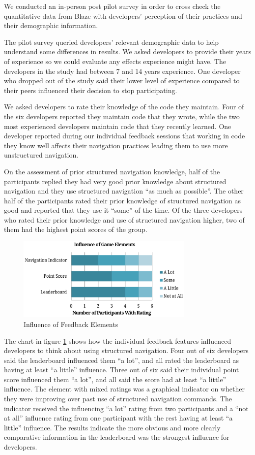 \documentclass{sig-alternate}
\begin{document}
We conducted an in-person post pilot survey in order to cross check the quantitative data from Blaze with developers' perception of their practices and their demographic information.

The pilot survey queried developers' relevant demographic data to help understand some differences in results.  We asked developers to provide their years of experience so we could evaluate any effects experience might have.  The developers in the study had between 7 and 14 years experience.  One developer who dropped out of the study said their lower level of experience compared to their peers influenced their decision to stop participating.  

We asked developers to rate their knowledge of the code they maintain.  Four of the six developers reported they maintain code that they wrote, while the two most experienced developers maintain code that they recently learned.  One developer reported during our individual feedback sessions that working in code they know well affects their navigation practices leading them to use more unstructured navigation.

On the assessment of prior structured navigation knowledge, half of the participants replied they had very good prior knowledge about structured navigation and they use structured navigation ``as much as possible''.  The other half of the participants rated their prior knowledge of structured navigation as good and reported that they use it ``some'' of the time. Of the three developers who rated their prior knowledge and use of structured navigation higher, two of them had the highest point scores of the group.

\begin{figure}
	\includegraphics[width=3.4in]{ElementInfluenceChart.pdf}
	\caption{Influence of Feedback Elements}
	\label{fig:elementInfluence}
\end{figure}

The chart in figure \ref{fig:elementInfluence} shows how the individual feedback features influenced developers to think about using structured navigation.  Four out of six developers said the leaderboard influenced them ``a lot'', and all rated the leaderboard as having at least ``a little'' influence.  Three out of six  said their individual point score influenced them ``a lot'', and all said the score had at least ``a little'' influence.  The element with mixed ratings was a graphical indicator on whether they were improving over past use of structured navigation commands.  The indicator received the influencing ``a lot'' rating from two participants and a ``not at all'' influence rating from one participant with the rest having at least ``a little'' influence.  The results indicate the more obvious and more clearly comparative information in the leaderboard was the strongest influence for developers.
\end{document}
